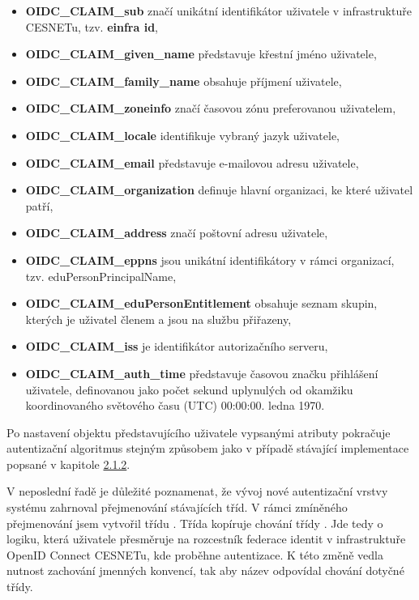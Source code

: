 \documentclass[
  printed, %
  twoside, %
  table,   %
  nolof,     %
  nolot,     %
]{fithesis3}
\begin{document}
\begin{itemize}
    \item \textbf{OIDC\_CLAIM\_sub} značí unikátní identifikátor uživatele v infrastruktuře CESNETu, tzv. \textbf{einfra id},
    \item \textbf{OIDC\_CLAIM\_given\_name} představuje křestní jméno uživatele,
    \item \textbf{OIDC\_CLAIM\_family\_name} obsahuje příjmení uživatele,
    \item \textbf{OIDC\_CLAIM\_zoneinfo} značí časovou zónu preferovanou uživatelem, 
    \item \textbf{OIDC\_CLAIM\_locale} identifikuje vybraný jazyk uživatele,
    \item \textbf{OIDC\_CLAIM\_email} představuje e-mailovou adresu uživatele,
    \item \textbf{OIDC\_CLAIM\_organization} definuje hlavní organizaci, ke které uživatel patří,
    \item \textbf{OIDC\_CLAIM\_address} značí poštovní adresu uživatele,
    \item \textbf{OIDC\_CLAIM\_eppns} jsou unikátní identifikátory v rámci organizací, tzv. eduPersonPrincipalName, 
    \item \textbf{OIDC\_CLAIM\_eduPersonEntitlement} obsahuje seznam skupin, kterých je uživatel členem a jsou na službu přiřazeny,
    \item \textbf{OIDC\_CLAIM\_iss} je identifikátor autorizačního serveru,
    \item \textbf{OIDC\_CLAIM\_auth\_time} představuje časovou značku přihlášení uživatele, definovanou jako počet sekund uplynulých od okamžiku koordinovaného světového času (UTC) 00:00:00. ledna 1970.
\end{itemize}

Po nastavení objektu představujícího uživatele vypsanými atributy pokračuje autentizační algoritmus stejným způsobem jako v případě stávající implementace popsané v kapitole \hyperref[meetings-old]{2.1.2}.

\par

V neposlední řadě je důležité poznamenat, že vývoj nové autentizační vrstvy systému  zahrnoval přejmenování stávajících tříd. V rámci zmíněného přejmenování jsem vytvořil třídu . Třída kopíruje chování třídy . Jde tedy o logiku, která uživatele přesměruje na rozcestník federace identit v infrastruktuře OpenID Connect CESNETu, kde proběhne autentizace. K této změně vedla nutnost zachování jmenných konvencí, tak aby název odpovídal chování dotyčné třídy. 
\end{document}
